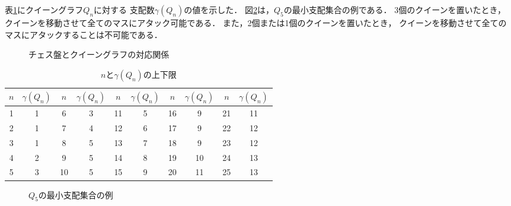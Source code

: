 表\ref{tb:queen_n}にクイーングラフ$Q_n$に対する
支配数$\gamma(Q_n)$の値を示した．
図\ref{ex:queengraph5}は，$Q_5$の最小支配集合の例である．
3個のクイーンを置いたとき，
クイーンを移動させて全てのマスにアタック可能である．
また，2個または1個のクイーンを置いたとき，
クイーンを移動させて全てのマスにアタックすることは不可能である．

\begin{figure}[htb]
  \label{ex:queengraph_3}
 \begin{minipage}[b]{0.35\linewidth}
  \centering
  
 \end{minipage} 
 \begin{minipage}[b]{0.2\linewidth}
  \centering
  
 \end{minipage}
 \begin{minipage}[b]{0.35\linewidth}
  \centering
  
 \end{minipage}
 \caption{チェス盤とクイーングラフの対応関係}
\end{figure}

\begin{table}[hbtp]
   \centering
   \caption{$n$と$\gamma(Q_n)$の上下限}
   \begin{tabular}{c|c||c|c||c|c||c|c||c|c} \hline
    $n$ & $\gamma(Q_{n})$ & $n$ & $\gamma(Q_{n})$ &$n$ & $\gamma(Q_{n})$ &$n$ & $\gamma(Q_{n})$ &$n$ & $\gamma(Q_{n})$ \\ \hline \hline
    1 &1 &6 &3 &11 &5 &16 &9 &21 &11\\ \hline
    2 &1 &7 &4 &12 &6 &17 &9 &22 &12\\ \hline
    3 &1 &8 &5 &13 &7 &18 &9 &23 &12\\ \hline
    4 &2 &9 &5 &14 &8 &19 &10 &24 &13\\ \hline
    5 &3 &10 &5 &15 &9 &20 &11 &25 &13\\ \hline
   \end{tabular}
   \label{tb:queen_n}
  \end{table}


\begin{figure}[htb]
  \centering
  
  \caption{$Q_5$の最小支配集合の例}
  \label{ex:queengraph5}
\end{figure}

